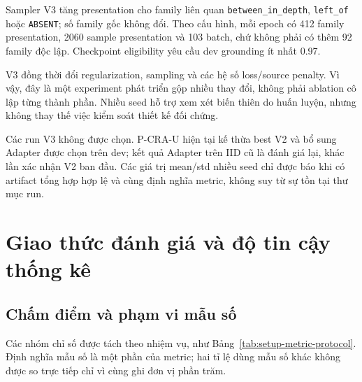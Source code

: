 {\setlength{\emergencystretch}{3em}
Sampler V3 tăng presentation cho family liên quan
\texttt{between\_\allowbreak in\_\allowbreak depth}, \texttt{left\_\allowbreak of} hoặc
\texttt{ABSENT}; số family gốc không đổi.
Theo cấu hình, mỗi epoch có 412 family presentation,
2060 sample presentation và 103 batch, chứ không
phải có thêm 92 family độc lập. Checkpoint eligibility
yêu cầu dev grounding ít nhất 0.97.\par}


V3 đồng thời đổi regularization, sampling và các hệ số
loss/source penalty. Vì vậy, đây là một experiment
phát triển gộp nhiều thay đổi, không phải ablation
cô lập từng thành phần. Nhiều seed hỗ trợ xem xét
biến thiên do huấn luyện, nhưng không thay thế việc
kiểm soát thiết kế đối chứng.

Các run V3 không được chọn. P-CRA-U hiện tại kế thừa best V2 và bổ sung Adapter được chọn trên dev; kết quả Adapter trên IID cũ là đánh giá lại, khác lần xác nhận V2 ban đầu. Các giá trị mean/std nhiều seed chỉ
được báo khi có artifact tổng hợp hợp lệ và cùng
định nghĩa metric, không suy từ sự tồn tại thư mục run.

\section{Giao thức đánh giá và độ tin cậy thống kê}
\label{sec:setup-evaluation}

\subsection{Chấm điểm và phạm vi mẫu số}

Các nhóm chỉ số được tách theo nhiệm vụ, như
Bảng~\ref{tab:setup-metric-protocol}. Định nghĩa mẫu số
là một phần của metric; hai tỉ lệ dùng mẫu số khác
không được so trực tiếp chỉ vì cùng ghi đơn vị phần trăm.

